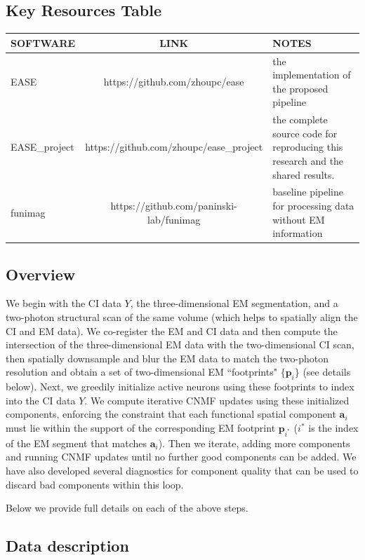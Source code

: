 \documentclass[10pt,letterpaper]{article}
\begin{document}
\subsection{Key Resources Table}
\begin{tabu} to 1
 \hline
 \textbf{SOFTWARE} & \textbf{LINK} & \textbf{NOTES} \\
 \hline
 EASE &https://github.com/zhoupc/ease& the implementation of the proposed pipeline \\
 \hline
 EASE\_project &https://github.com/zhoupc/ease\_project & the complete source code for reproducing this research and the shared results. \\
 \hline
 funimag  & https://github.com/paninski-lab/funimag  & baseline pipeline for processing data without EM information  \\
\hline
\end{tabu}


\subsection{Overview}
We begin with the CI data $Y$, the three-dimensional EM segmentation,  and a two-photon structural scan of the same volume (which helps to spatially align the CI and EM data).  We co-register the EM and CI data and then compute the intersection of the three-dimensional EM data with the two-dimensional CI scan, then spatially downsample and blur the EM data to match the two-photon resolution and obtain a set of two-dimensional EM ``footprints" $\{\bm{p}_i\}$ (see details below). Next, we greedily initialize active neurons using these footprints to index into the CI data $Y$.  We compute iterative CNMF updates using these initialized components, enforcing the constraint that each functional spatial component $\bm{a}_i$ must lie within the support of the corresponding EM footprint $\bm{p}_{i^*}$ ($i^*$ is the index of the EM segment that matches $\bm{a}_i$).  Then we iterate, adding more components and running CNMF updates until no further good components can be added.  We have also developed several diagnostics for component quality that can be used to discard bad components within this loop.

Below we provide full details on each of the above steps.

\subsection{Data description}
\end{document}
